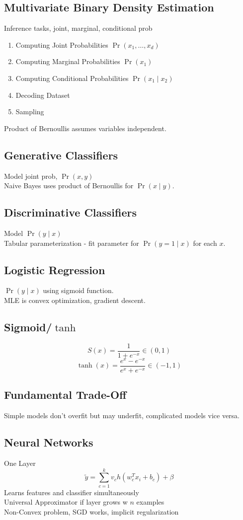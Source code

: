 \subsection*{Multivariate Binary Density Estimation}
Inference tasks, joint, marginal, conditional prob
\begin{enumerate}
    \item Computing Joint Probabilities $\Pr(x_1,\dots,x_d)$
    \item Computing Marginal Probabilities $\Pr(x_1)$
    \item Computing Conditional Probabilities $\Pr(x_1\mid x_2)$
    \item Decoding Dataset
    \item Sampling
\end{enumerate}
Product of Bernoullis assumes variables independent.
\subsection*{Generative Classifiers}
Model joint prob, $\Pr(x,y)$\\
Naive Bayes uses product of Bernoullis for $\Pr(x\mid y)$.
\subsection*{Discriminative Classifiers}
Model $\Pr(y\mid x)$\\
Tabular parameterization - fit parameter for $\Pr(y=1\mid x)$ for each $x$.\\
\subsection*{Logistic Regression}
$\Pr(y\mid x)$ using sigmoid function.\\
MLE is convex optimization, gradient descent.
\subsection*{Sigmoid/$\tanh$}
\[S(x)=\frac{1}{1+e^{-x}}\in(0,1)\]
\[\tanh(x)=\frac{e^x-e^{-x}}{e^x+e^{-x}}\in(-1,1)\]
\subsection*{Fundamental Trade-Off}
Simple models don't overfit but may underfit, complicated models vice versa.
\subsection*{Neural Networks}
One Layer
\[\tilde{y}=\sum_{c=1}^k v_c h(w_c^T x_i + b_c) + \beta\]
Learns features and classifier simultaneously\\
Universal Approximator if layer grows w $n$ examples\\
Non-Convex problem, SGD works, implicit regularization\\
